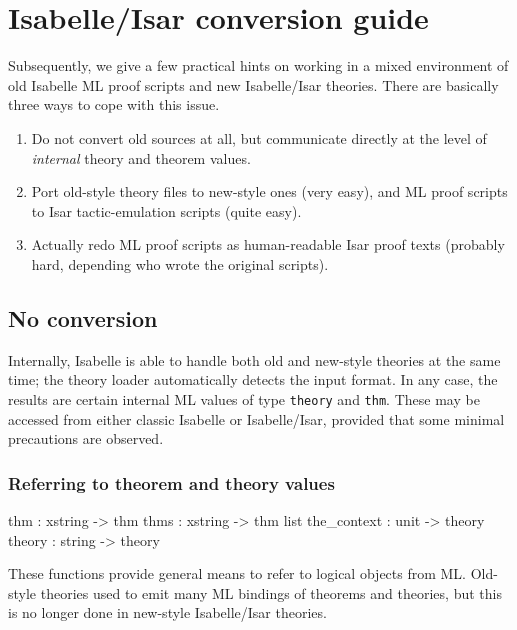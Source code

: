 
\chapter{Isabelle/Isar conversion guide}\label{ap:conv}

Subsequently, we give a few practical hints on working in a mixed environment
of old Isabelle ML proof scripts and new Isabelle/Isar theories.  There are
basically three ways to cope with this issue.
\begin{enumerate}
\item Do not convert old sources at all, but communicate directly at the level
  of \emph{internal} theory and theorem values.
\item Port old-style theory files to new-style ones (very easy), and ML proof
  scripts to Isar tactic-emulation scripts (quite easy).
\item Actually redo ML proof scripts as human-readable Isar proof texts
  (probably hard, depending who wrote the original scripts).
\end{enumerate}


\section{No conversion}

Internally, Isabelle is able to handle both old and new-style theories at the
same time; the theory loader automatically detects the input format.  In any
case, the results are certain internal ML values of type \texttt{theory} and
\texttt{thm}.  These may be accessed from either classic Isabelle or
Isabelle/Isar, provided that some minimal precautions are observed.


\subsection{Referring to theorem and theory values}

\begin{ttbox}
thm         : xstring -> thm
thms        : xstring -> thm list
the_context : unit -> theory
theory      : string -> theory
\end{ttbox}

These functions provide general means to refer to logical objects from ML.
Old-style theories used to emit many ML bindings of theorems and theories, but
this is no longer done in new-style Isabelle/Isar theories.

